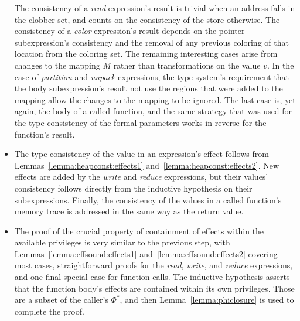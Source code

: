 \begin{itemize}
The consistency of a {\em read} expression's result is trivial when an address falls in the
clobber set, and counts on the consistency of the store otherwise.  The consistency of a 
{\em color} expression's result depends on the pointer subexpression's consistency and the 
removal of any previous coloring of that location from the coloring set.  The remaining
interesting cases arise from changes to the mapping $M$ rather than transformations on the
value $v$.  In the case of {\em partition} and {\em unpack} expressions, the type system's
requirement that the body subexpression's result not use the regions that were added to the
mapping allow the changes to the mapping to be ignored.  The last case is, yet again, the body
of a called function, and the same strategy that was used for the type consistency of the
formal parameters works in reverse for the function's result.

\item The type consistency of the value in an expression's effect follows from
Lemmas~\ref{lemma:heapconst:effects1} and~\ref{lemma:heapconst:effects2}.  New effects are
added by the {\em write} and {\em reduce} expressions, but their values' consistency follows
directly from the inductive hypothesis on their subexpressions.  Finally, the consistency of the
values in a called function's memory trace is addressed in the same way as the return value.

\item The proof of the crucial property of containment of effects within the available privileges
is very similar to the previous step, with Lemmas~\ref{lemma:effsound:effects1}
and~\ref{lemma:effsound:effects2} covering most cases, straightforward proofs for the {\em read},
{\em write}, and {\em reduce} expressions, and one final special case for function calls.  The 
inductive hypothesis asserts that the function body's effects are contained within its own
privileges.  Those are a subset of the caller's $\Phi^*$, and then Lemma~\ref{lemma:phiclosure}
is used to complete the proof.
\end{itemize}

